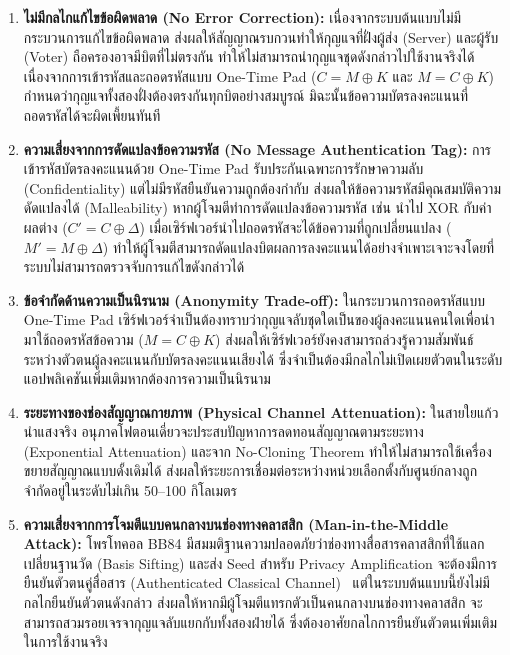 \begin{enumerate}
    \item \textbf{ไม่มีกลไกแก้ไขข้อผิดพลาด (No Error Correction):} เนื่องจากระบบต้นแบบไม่มีกระบวนการแก้ไขข้อผิดพลาด ส่งผลให้สัญญาณรบกวนทำให้กุญแจที่ฝั่งผู้ส่ง (Server) และผู้รับ (Voter) ถือครองอาจมีบิตที่ไม่ตรงกัน ทำให้ไม่สามารถนำกุญแจชุดดังกล่าวไปใช้งานจริงได้ เนื่องจากการเข้ารหัสและถอดรหัสแบบ One-Time Pad ($C = M \oplus K$ และ $M = C \oplus K$) กำหนดว่ากุญแจทั้งสองฝั่งต้องตรงกันทุกบิตอย่างสมบูรณ์ มิฉะนั้นข้อความบัตรลงคะแนนที่ถอดรหัสได้จะผิดเพี้ยนทันที
    
    \item \textbf{ความเสี่ยงจากการดัดแปลงข้อความรหัส (No Message Authentication Tag):} การเข้ารหัสบัตรลงคะแนนด้วย One-Time Pad รับประกันเฉพาะการรักษาความลับ (Confidentiality) แต่ไม่มีรหัสยืนยันความถูกต้องกำกับ ส่งผลให้ข้อความรหัสมีคุณสมบัติความดัดแปลงได้ (Malleability) หากผู้โจมตีทำการดัดแปลงข้อความรหัส เช่น นำไป XOR กับค่าผลต่าง ($C' = C \oplus \Delta$) เมื่อเซิร์ฟเวอร์นำไปถอดรหัสจะได้ข้อความที่ถูกเปลี่ยนแปลง ($M' = M \oplus \Delta$) ทำให้ผู้โจมตีสามารถดัดแปลงบิตผลการลงคะแนนได้อย่างจำเพาะเจาะจงโดยที่ระบบไม่สามารถตรวจจับการแก้ไขดังกล่าวได้
    
    \item \textbf{ข้อจำกัดด้านความเป็นนิรนาม (Anonymity Trade-off):} ในกระบวนการถอดรหัสแบบ One-Time Pad เซิร์ฟเวอร์จำเป็นต้องทราบว่ากุญแจลับชุดใดเป็นของผู้ลงคะแนนคนใดเพื่อนำมาใช้ถอดรหัสข้อความ ($M = C \oplus K$) ส่งผลให้เซิร์ฟเวอร์ยังคงสามารถล่วงรู้ความสัมพันธ์ระหว่างตัวตนผู้ลงคะแนนกับบัตรลงคะแนนเสียงได้ ซึ่งจำเป็นต้องมีกลไกไม่เปิดเผยตัวตนในระดับแอปพลิเคชันเพิ่มเติมหากต้องการความเป็นนิรนาม
    
    \item \textbf{ระยะทางของช่องสัญญาณกายภาพ (Physical Channel Attenuation):} ในสายใยแก้วนำแสงจริง อนุภาคโฟตอนเดี่ยวจะประสบปัญหาการลดทอนสัญญาณตามระยะทาง (Exponential Attenuation) และจาก No-Cloning Theorem ทำให้ไม่สามารถใช้เครื่องขยายสัญญาณแบบดั้งเดิมได้ ส่งผลให้ระยะการเชื่อมต่อระหว่างหน่วยเลือกตั้งกับศูนย์กลางถูกจำกัดอยู่ในระดับไม่เกิน 50--100 กิโลเมตร

    \item \textbf{ความเสี่ยงจากการโจมตีแบบคนกลางบนช่องทางคลาสสิก (Man-in-the-Middle Attack):} โพรโทคอล BB84 มีสมมติฐานความปลอดภัยว่าช่องทางสื่อสารคลาสสิกที่ใช้แลกเปลี่ยนฐานวัด (Basis Sifting) และส่ง Seed สำหรับ Privacy Amplification จะต้องมีการยืนยันตัวตนคู่สื่อสาร (Authenticated Classical Channel)~\cite{wegman_carter_1981, scarani_qkd_practical} แต่ในระบบต้นแบบนี้ยังไม่มีกลไกยืนยันตัวตนดังกล่าว ส่งผลให้หากมีผู้โจมตีแทรกตัวเป็นคนกลางบนช่องทางคลาสสิก จะสามารถสวมรอยเจรจากุญแจลับแยกกับทั้งสองฝ่ายได้ ซึ่งต้องอาศัยกลไกการยืนยันตัวตนเพิ่มเติมในการใช้งานจริง
\end{enumerate}

